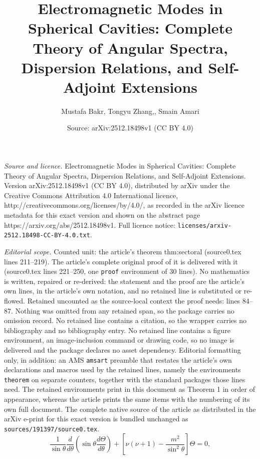\documentclass[10pt,a4paper]{amsart}
\title{Electromagnetic Modes in Spherical Cavities: Complete Theory of Angular Spectra, Dispersion Relations, and Self-Adjoint Extensions}
\author{Mustafa Bakr, Tongyu Zhang,, Smain Amari}
\date{Source: arXiv:2512.18498v1 (CC BY 4.0)}
\begin{document}
\maketitle

\noindent\emph{Source and licence.} Electromagnetic Modes in Spherical Cavities: Complete Theory of Angular Spectra, Dispersion Relations, and Self-Adjoint Extensions. Version arXiv:2512.18498v1 (CC BY 4.0), distributed by arXiv under the Creative Commons Attribution 4.0 International licence, http://creativecommons.org/licenses/by/4.0/, as recorded in the arXiv licence metadata for this exact version and shown on the abstract page https://arxiv.org/abs/2512.18498v1. Full licence notice: \texttt{licenses/arxiv-2512.18498-CC-BY-4.0.txt}.\par\smallskip

\noindent\textit{Editorial scope.} Counted unit: the article's theorem thm:sectoral (source0.tex lines 211--219). The article's complete original proof of it is delivered with it (source0.tex lines 221--250, one \texttt{proof} environment of 30 lines). No mathematics is written, repaired or re-derived: the statement and the proof are the article's own lines, in the article's own notation, and no retained line is substituted or re-flowed.  Retained uncounted as the source-local context the proof needs: lines 84--87.  Nothing was omitted from any retained span, so the package carries no omission record.  No retained line contains a citation, so the wrapper carries no bibliography and no bibliography entry.  No retained line contains a figure environment, an image-inclusion command or drawing code, so no image is delivered and the package declares no asset dependency.  Editorial formatting only, in addition: an AMS \texttt{amsart} preamble that restates the article's own declarations and macros used by the retained lines, namely the environments \texttt{theorem} on separate counters, together with the standard packages those lines need.  The retained environments print in this document as Theorem 1 in order of appearance, whereas the article prints the same items with the numbering of its own full document.  The complete native source of the article as distributed in the arXiv e-print for this exact version is bundled unchanged as \texttt{sources/191397/source0.tex}.
\begin{equation}
\frac{1}{\sin\theta}\frac{d}{d\theta}\left(\sin\theta\frac{d\Theta}{d\theta}\right) + \left[\nu(\nu+1) - \frac{m^2}{\sin^2\theta}\right]\Theta = 0,
\label{eq:angular_ode}
\end{equation}
\end{document}
